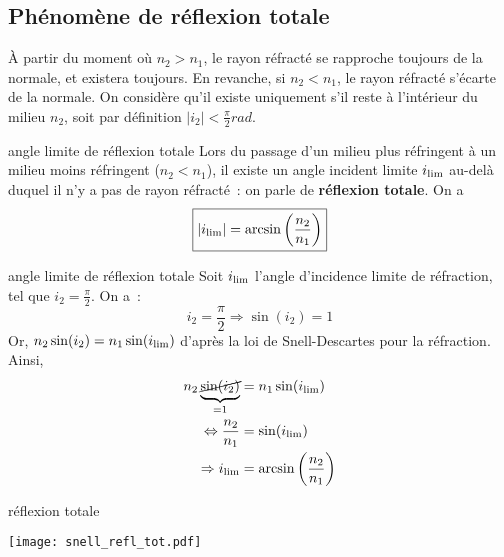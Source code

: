 \documentclass[../main/main.tex]{subfiles}
\begin{document}
\newpage

\subsection{Phénomène de réflexion totale}

À partir du moment où $n_2 > n_1$, le rayon réfracté se rapproche toujours de la
normale, et existera toujours. En revanche, si $n_2 < n_1$, le rayon réfracté
s'écarte de la normale. On considère qu'il existe uniquement s'il reste à
l'intérieur du milieu $n_2$, soit par définition $|i_2| <
\frac{\pi}{2}\si{rad}$.

\begin{tcbraster}[raster columns=3, raster equal height=rows]
    \begin{prop}[label=prop:ilim, valign=center]{angle limite de réflexion
        totale}
        Lors du passage d'un milieu plus réfringent à un milieu moins réfringent
        ($n_2 < n_1$), il existe un angle incident limite $i_{\rm lim}$ au-delà
        duquel il n'y a pas de rayon réfracté~: on parle de \textbf{réflexion
        totale}. On a
        \[ \boxed{|i_{\rm lim}| = \arcsin \left( \frac{n_2}{n_1} \right)}\]
    \end{prop}
    \begin{demo}[label=demo:ilim, raster multicolumn=2]{angle limite de
        réflexion totale}
        Soit $i_{\rm lim}$ l'angle d'incidence limite de réfraction, tel que
        $i_2 = \frac{\pi}{2}$. On a~:
        \begin{equation*}
            i_2 = \frac{\pi}{2} \Rightarrow \sin(i_2) = 1
        \end{equation*}
        Or, $n_2\sin(i_2) = n_1\sin(i_{\rm lim})$ d'après la loi de
        Snell-Descartes pour la réfraction. Ainsi,
        \begin{align*}
            n_2 \underbrace{\cancel{\sin(i_2)}}_{=1} & = n_1\sin(i_{\rm lim})\\
            \Leftrightarrow \frac{n_2}{n_1} & = \sin(i_{\rm lim})\\
            \Rightarrow i_{\rm lim} & = \arcsin \left( \frac{n_2}{n_1} \right)
        \end{align*}
    \end{demo}
\end{tcbraster}

\begin{exem}[label=exem:ilim]{réflexion totale}
    \begin{center}
        \texttt{[image: snell\_refl\_tot.pdf]}
        \captionsetup{justification=centering}
        \label{fig:refl_tot}
    \end{center}
\end{exem}
\end{document}
